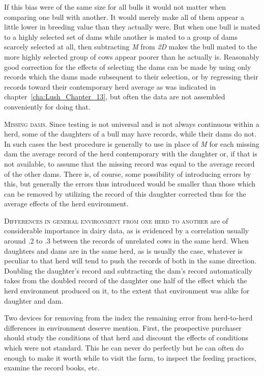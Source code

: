 If this bias were of the same size for all bulls it would not matter
when comparing one bull with another. It would merely make all of
them appear a little lower in breeding value than they actually were.
But when one bull is mated to a highly selected set of dams while another
is mated to a group of dams scarcely selected at all, then subtracting
\textit{M} from \textit{2D} makes the bull mated to the more highly
selected group of cows appear poorer than he actually is. Reasonably
good correction for the effects of selecting the dams can be made by
using only records which the dams made subsequent to their selection,
or by regressing their records toward their contemporary herd average
as was indicated in chapter~\ref{cha:Lush_Chapter_13}, but often the
data are not assembled conveniently for doing that.

\textsc{Missing dams}. Since testing is not universal and is not always
continuous within a herd, some of the daughters of a bull may have records,
while their dams do not. In such cases the best procedure is generally
to use in place of \textit{M} for each missing dam the average record of the
herd contemporary with the daughter or, if that is not available, to
assume that the missing record was equal to the average record of the
other dams. There is, of course, some possibility of introducing errors
by this, but generally the errors thus introduced would be smaller than
those which can be removed by utilizing the record of this daughter corrected
thus for the average effects of the herd environment.

\textsc{Differences in general environment from one herd to another}
are of considerable importance in dairy data, as is evidenced by a correlation
usually around .2 to .3 between the records of unrelated cows
in the same herd. When daughters and dams are in the same herd, as is
usually the case, whatever is peculiar to that herd will tend to push the
records of both in the same direction. Doubling the daughter's record
and subtracting the dam's record automatically takes from the doubled
record of the daughter one half of the effect which the herd environment
produced on it, to the extent that environment was alike for
daughter and dam.

Two devices for removing from the index the remaining error from
herd-to-herd differences in environment deserve mention. First, the
prospective purchaser should study the conditions of that herd and discount
the effects of conditions which were not standard. This he can
never do perfectly but he can often do enough to make it worth while
to visit the farm, to inspect the feeding practices, examine the record
books, etc.

